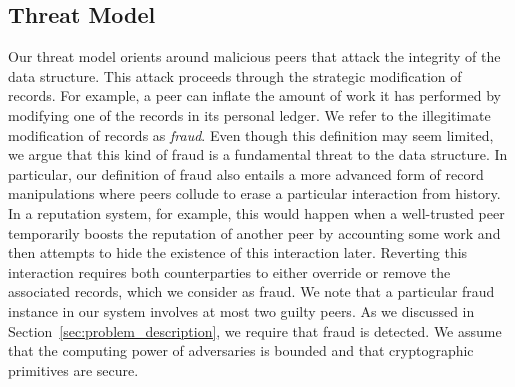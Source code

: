 \subsection{Threat Model}
\label{sec:threat_model}
Our threat model orients around malicious peers that attack the integrity of the \ModelName{} data structure.
This attack proceeds through the strategic modification of \ModelName{} records.
For example, a peer can inflate the amount of work it has performed by modifying one of the records in its personal ledger.
We refer to the illegitimate modification of \ModelName{} records as \emph{fraud}.
Even though this definition may seem limited, we argue that this kind of fraud is a fundamental threat to the \ModelName{} data structure.
In particular, our definition of fraud also entails a more advanced form of record manipulations where peers collude to erase a particular interaction from history.
In a reputation system, for example, this would happen when a well-trusted peer temporarily boosts the reputation of another peer by accounting some work and then attempts to hide the existence of this interaction later.
Reverting this interaction requires both counterparties to either override or remove the associated records, which we consider as fraud.
We note that a particular fraud instance in our system involves at most two guilty peers.
As we discussed in Section~\ref{sec:problem_description}, we require that fraud is detected.
We assume that the computing power of adversaries is bounded and that cryptographic primitives are secure.




